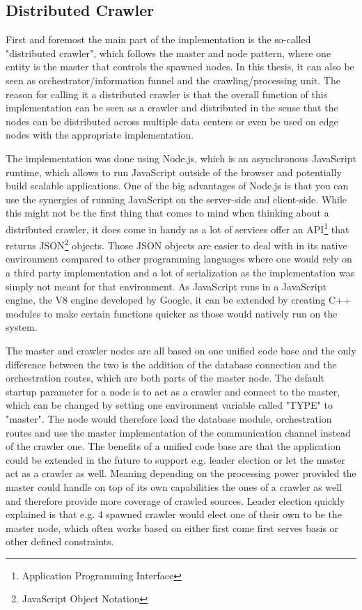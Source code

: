 \subsection{Distributed Crawler}
First and foremost the main part of the implementation is the so-called "distributed crawler", which follows the master and node pattern, where one entity is the master that controls the spawned nodes. In this thesis, it can also be seen as orchestrator/information funnel and the crawling/processing unit. The reason for calling it a distributed crawler is that the overall function of this implementation can be seen as a crawler and distributed in the sense that the nodes can be distributed across multiple data centers or even be used on edge nodes with the appropriate implementation.

The implementation was done using Node.js, which is an asynchronous JavaScript runtime, which allows to run JavaScript outside of the browser and potentially build scalable applications. One of the big advantages of Node.js is that you can use the synergies of running JavaScript on the server-side and client-side. While this might not be the first thing that comes to mind when thinking about a distributed crawler, it does come in handy as a lot of services offer an API\footnote{Application Programming Interface} that returns JSON\footnote{JavaScript Object Notation} objects. Those JSON objects are easier to deal with in its native environment compared to other programming languages where one would rely on a third party implementation and a lot of serialization as the implementation was simply not meant for that environment.
As JavaScript runs in a JavaScript engine, the V8 engine developed by Google, it can be extended by creating C++ modules to make certain functions quicker as those would natively run on the system.

The master and crawler nodes are all based on one unified code base and the only difference between the two is the addition of the database connection and the orchestration routes, which are both parts of the master node. The default startup parameter for a node is to act as a crawler and connect to the master, which can be changed by setting one environment variable called "TYPE" to "master". The node would therefore load the database module, orchestration routes and use the master implementation of the communication channel instead of the crawler one.
The benefits of a unified code base are that the application could be extended in the future to support e.g. leader election or let the master act as a crawler as well. Meaning depending on the processing power provided the master could handle on top of its own capabilities the ones of a crawler as well and therefore provide more coverage of crawled sources.
Leader election quickly explained is that e.g. 4 spawned crawler would elect one of their own to be the master node, which often works based on either first come first serves basis or other defined constraints.

